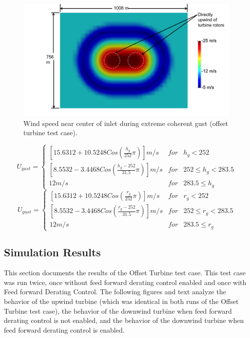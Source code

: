\begin{figure}[ht]  
	\centering
		\includegraphics[width = \linewidth]{Figures/ch6Figures/fig6-13.png}

	\caption{Wind speed near center of inlet during extreme coherent gust (offset turbine test case).}
\label{fig6-13}
\end{figure}

\begin{equation} 
	U_{gust}=\left\{\begin{matrix}
\left [15.6312 +10.5248Cos\left ( \frac{h_g}{252 }\pi  \right )  \right ]m/s & for  & h_g<252\\ 
 \left [8.5532 -3.4468Cos\left ( \frac{h_g-252}{31.5}\pi  \right )  \right ]m/s & for  & 252 \leq h_g <283.5\\ 
 12 m/s &  for & 283.5 \leq h_g
\end{matrix}\right. 
\label{eq6-2}
\end{equation}
\begin{equation} 
	U_{gust}=\left\{\begin{matrix}
\left [15.6312 +10.5248Cos\left ( \frac{r_g}{252 }\pi  \right )  \right ]m/s & for  & r_g<252\\ 
 \left [8.5532 -3.4468Cos\left ( \frac{r_g-252}{31.5}\pi  \right )  \right ]m/s & for  & 252 \leq r_g <283.5\\ 
 12 m/s &  for & 283.5 \leq r_g
\end{matrix}\right. 
\label{eq6-3}
\end{equation}

\subsection{Simulation Results} \label{section6-6-2}
This section documents the results of the Offset Turbine test case. This test case was run twice, once without feed forward derating control enabled and once with Feed forward Derating Control. The following figures and text analyze the behavior of the upwind turbine (which was identical in both runs of the Offset Turbine test case), the behavior of the downwind turbine when feed forward derating control is not enabled, and the behavior of the downwind turbine when feed forward derating control is enabled.


